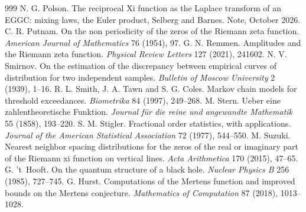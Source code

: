 \begin{thebibliography}{999}
 N. G. Polson. The reciprocal Xi function as the Laplace transform of an EGGC: mixing laws, the Euler product, Selberg and Barnes. Note, October 2026.
 C. R. Putnam. On the non periodicity of the zeros of the Riemann zeta function. \emph{American Journal of Mathematics} 76 (1954), 97.
 G. N. Remmen. Amplitudes and the Riemann zeta function. \emph{Physical Review Letters} 127 (2021), 241602. %
 N. V. Smirnov. On the estimation of the discrepancy between empirical curves of distribution for two independent samples. \emph{Bulletin of Moscow University} 2 (1939), 1--16. %
 R. L. Smith, J. A. Tawn and S. G. Coles. Markov chain models for threshold exceedances. \emph{Biometrika} 84 (1997), 249--268.
 M. Stern. Ueber eine zahlentheoretische Funktion. \emph{Journal f\"ur die reine und angewandte Mathematik} 55 (1858), 193--220.
 S. M. Stigler. Fractional order statistics, with applications. \emph{Journal of the American Statistical Association} 72 (1977), 544--550.
 M. Suzuki. Nearest neighbor spacing distributions for the zeros of the real or imaginary part of the Riemann xi function on vertical lines. \emph{Acta Arithmetica} 170 (2015), 47--65.
 G. 't~Hooft. On the quantum structure of a black hole. \emph{Nuclear Physics B} 256 (1985), 727--745.
 G. Hurst. Computations of the Mertens function and improved bounds on the Mertens conjecture. \emph{Mathematics of Computation} 87 (2018), 1013--1028.

\end{thebibliography}
